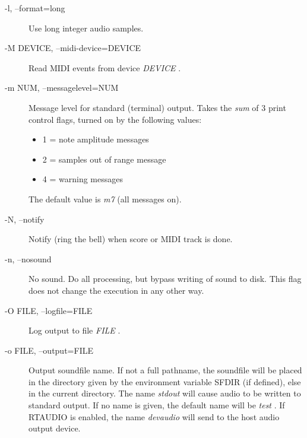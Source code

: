 \begin{description}
\item[-l, --format=long]

  Use long integer audio samples. 

\item[-M DEVICE, --midi-device=DEVICE]

  Read MIDI events from device \emph{DEVICE}
. 

\item[-m NUM, --messagelevel=NUM]

  Message level for standard (terminal) output. Takes the \emph{sum}
 of 3 print control flags, turned on by the following values: 


 
\begin{itemize}
\item 

 1 = note amplitude messages

\item 

 2 = samples out of range message

\item 

 4 = warning messages


\end{itemize}


  The default value is \emph{m7}
 (all messages on). 

\item[-N, --notify]

  Notify (ring the bell) when score or MIDI track is done. 

\item[-n, --nosound]

  No sound. Do all processing, but bypass writing of sound to disk. This flag does not change the execution in any other way. 

\item[-O FILE, --logfile=FILE]

  Log output to file \emph{FILE}
. 

\item[-o FILE, --output=FILE]

  Output soundfile name. If not a full pathname, the soundfile will be placed in the directory given by the environment variable SFDIR (if defined), else in the current directory. The name \emph{stdout}
 will cause audio to be written to standard output. If no name is given, the default name will be \emph{test}
. If RTAUDIO is enabled, the name \emph{devaudio}
 will send to the host audio output device. 


\end{description}
